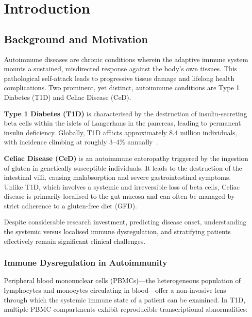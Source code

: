 \chapter{Introduction}
\label{chap:intro}

\section{Background and Motivation}

Autoimmune diseases are chronic conditions wherein the adaptive immune system mounts a sustained, misdirected response against the body's own tissues. This pathological self-attack leads to progressive tissue damage and lifelong health complications. Two prominent, yet distinct, autoimmune conditions are Type 1 Diabetes (T1D) and Celiac Disease (CeD).

\textbf{Type 1 Diabetes (T1D)} is characterised by the destruction of insulin-secreting beta cells within the islets of Langerhans in the pancreas, leading to permanent insulin deficiency. Globally, T1D afflicts approximately 8.4 million individuals, with incidence climbing at roughly 3--4\% annually~\cite{theodoris2023transfer}. 

\textbf{Celiac Disease (CeD)} is an autoimmune enteropathy triggered by the ingestion of gluten in genetically susceptible individuals. It leads to the destruction of the intestinal villi, causing malabsorption and severe gastrointestinal symptoms. Unlike T1D, which involves a systemic and irreversible loss of beta cells, Celiac disease is primarily localised to the gut mucosa and can often be managed by strict adherence to a gluten-free diet (GFD).

Despite considerable research investment, predicting disease onset, understanding the systemic versus localised immune dysregulation, and stratifying patients effectively remain significant clinical challenges.

\subsection{Immune Dysregulation in Autoimmunity}

Peripheral blood mononuclear cells (PBMCs)---the heterogeneous population of lymphocytes and monocytes circulating in blood---offer a non-invasive lens through which the systemic immune state of a patient can be examined. In T1D, multiple PBMC compartments exhibit reproducible transcriptional abnormalities:

